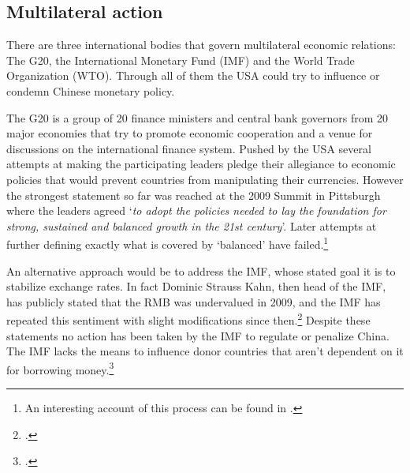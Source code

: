 

\subsection{Multilateral action}

There are three international bodies that govern multilateral economic relations: The 
G20, the International Monetary Fund (IMF) and the World Trade 
Organization (WTO). Through all of them the USA could try to influence or condemn Chinese monetary policy.

The G20 is a group of 20 finance ministers and central bank governors 
from 20 major economies that try to promote economic cooperation and a 
venue for discussions on the international finance system. Pushed by the 
USA several attempts at making the participating leaders pledge their 
allegiance to economic policies that would prevent countries from 
manipulating their currencies. However the strongest statement so far 
was reached at the 2009 Summit in Pittsburgh where the leaders agreed 
`\textit{to adopt the policies needed to lay the foundation for strong, 
sustained and balanced growth in the 21st century}'. Later attempts at 
further defining exactly what is covered by `balanced' have 
failed.\footnote{An interesting account of this process can be found in 
\cite{Levy11}.}

An alternative approach would be to address the IMF, whose stated goal it
is to stabilize exchange rates. In fact Dominic Strauss Kahn, then head of the IMF, has 
publicly stated that the RMB was undervalued in 2009, and the IMF has 
repeated this sentiment with slight modifications since 
then.\footnote{\cite{reuters09}.}  Despite these statements no action has been taken 
by the IMF to regulate or penalize China. The IMF
lacks the means to influence donor countries that aren't dependent on it for 
borrowing money.\footnote{\cite{Levy2010}.}

